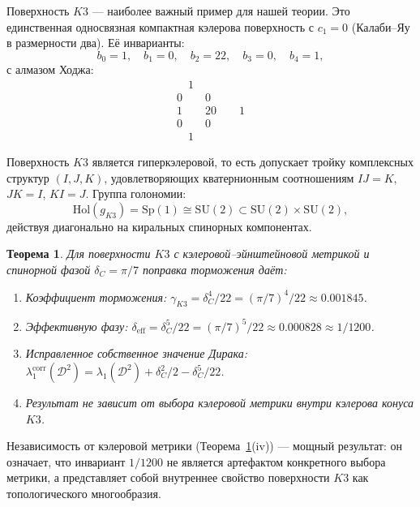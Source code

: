 \documentclass[12pt,a4paper]{article}
\newtheorem{theorem}{Теорема}[section]
\theoremstyle{definition}
\theoremstyle{remark}
\newcommand{\Sp}{\mathrm{Sp}}
\newcommand{\cD}{\mathcal{D}}
\newcommand{\SU}{\mathrm{SU}}
\newcommand{\Hol}{\mathrm{Hol}}
\begin{document}
Поверхность $K3$ --- наиболее важный пример для нашей теории. Это единственная односвязная компактная кэлерова поверхность с $c_1 = 0$ (Калаби--Яу в размерности два). Её инварианты:
\begin{equation}
b_0 = 1, \quad b_1 = 0, \quad b_2 = 22, \quad b_3 = 0, \quad b_4 = 1,
\end{equation}
с алмазом Ходжа:
\begin{equation}
\begin{array}{c}
\quad 1 \quad \\
0 \quad\quad 0 \\
1 \quad\quad 20 \quad\quad 1 \\
0 \quad\quad 0 \\
\quad 1 \quad
\end{array}
\end{equation}

Поверхность $K3$ является гиперкэлеровой, то есть допускает тройку комплексных структур $(I, J, K)$, удовлетворяющих кватернионным соотношениям $IJ = K$, $JK = I$, $KI = J$. Группа голономии:
\begin{equation}
\Hol(g_{K3}) = \Sp(1) \cong \SU(2) \subset \SU(2) \times \SU(2),
\end{equation}
действуя диагонально на киральных спинорных компонентах.

\begin{theorem}
\label{thm:k3-braking-ru}
Для поверхности $K3$ с кэлеровой--эйнштейновой метрикой и спинорной фазой $\delta_C = \pi/7$ поправка торможения даёт:
\begin{enumerate}[label=(\roman*)]
\item Коэффициент торможения: $\gamma_{K3} = \delta_C^4/22 = (\pi/7)^4/22 \approx 0.001845$.
\item Эффективную фазу: $\delta_{\mathrm{eff}} = \delta_C^5/22 = (\pi/7)^5/22 \approx 0.000828 \approx 1/1200$.
\item Исправленное собственное значение Дирака: $\lambda_1^{\mathrm{corr}}(\cD^2) = \lambda_1(\cD^2) + \delta_C^2/2 - \delta_C^5/22$.
\item Результат не зависит от выбора кэлеровой метрики внутри кэлерова конуса $K3$.
\end{enumerate}
\end{theorem}

Независимость от кэлеровой метрики (Теорема~\ref{thm:k3-braking-ru}(iv)) --- мощный результат: он означает, что инвариант $1/1200$ не является артефактом конкретного выбора метрики, а представляет собой внутреннее свойство поверхности $K3$ как топологического многообразия.
\end{document}
